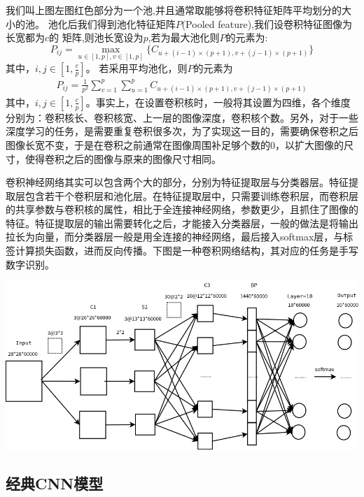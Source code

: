 我们叫上图左图红色部分为一个池,并且通常取能够将卷积特征矩阵平均划分的大小的池。
池化后我们得到池化特征矩阵$P$(Pooled feature),我们设卷积特征图像为长宽都为$c$的
矩阵,则池长宽设为$p$,若为最大池化则$P$的元素为:
\begin{equation}
P_{ij}=\max_{u\in[1,p],v\in[1,p]}\{C_{u+(i-1)\times(p+1),v+(j-1)\times(p+1)}\}
\end{equation}
其中，$i,j\in[1,\frac{c}{p}]$。
若采用平均池化，则$P$的元素为
\begin{eqnarray}
P_{ij}=\frac{1}{p^2}\sum_{v=1}^p\sum_{u=1}^pC_{u+(i-1)\times(p+1),v+(j-1)\times(p+1)}
\end{eqnarray}
其中，$i,j\in[1,\frac{c}{p}]$。事实上，在设置卷积核时，一般将其设置为四维，各个维度分别为：卷积核长、卷积核宽、上一层的图像深度，卷积核个数。另外，对于一些深度学习的任务，是需要重复卷积很多次，为了实现这一目的，需要确保卷积之后图像长宽不变，于是在卷积之前通常在图像周围补足够个数的0，以扩大图像的尺寸，使得卷积之后的图像与原来的图像尺寸相同。

卷积神经网络其实可以包含两个大的部分，分别为特征提取层与分类器层。特征提取层包含若干个卷积层和池化层。在特征提取层中，只需要训练卷积层，而卷积层的共享参数与卷积核的属性，相比于全连接神经网络，参数更少，且抓住了图像的特征。特征提取层的输出需要转化之后，才能接入分类器层，一般的做法是将输出拉长为向量，而分类器层一般是用全连接的神经网络，最后接入softmax层，与标签计算损失函数，进而反向传播。下图是一种卷积网络结构，其对应的任务是手写数字识别。

\begin{center}
\includegraphics[scale=0.4]{../figures/CNN1.png} 
\end{center}
\subsection{经典CNN模型}
